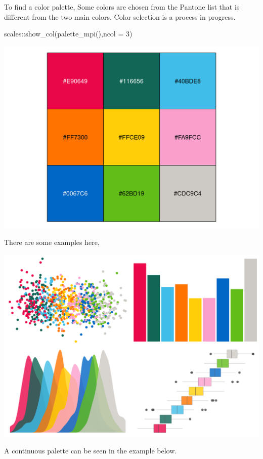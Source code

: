 \documentclass[
]{book}
\newenvironment{Shaded}{\begin{snugshade}}{\end{snugshade}}
\newcommand{\AttributeTok}[1]{\textcolor[rgb]{0.77,0.63,0.00}{#1}}
\newcommand{\DecValTok}[1]{\textcolor[rgb]{0.00,0.00,0.81}{#1}}
\newcommand{\FunctionTok}[1]{\textcolor[rgb]{0.00,0.00,0.00}{#1}}
\newcommand{\NormalTok}[1]{#1}
\newcommand{\SpecialCharTok}[1]{\textcolor[rgb]{0.00,0.00,0.00}{#1}}
\begin{document}
To find a color palette, Some colors are chosen from the Pantone list that is different from the two main colors. Color selection is a process in progress.

\begin{Shaded}
\begin{Highlighting}[]
\NormalTok{scales}\SpecialCharTok{::}\FunctionTok{show\_col}\NormalTok{(}\FunctionTok{palette\_mpi}\NormalTok{(),}\AttributeTok{ncol =} \DecValTok{3}\NormalTok{)}
\end{Highlighting}
\end{Shaded}

\begin{center}\includegraphics[width=0.5\linewidth]{figures/mpithemes_palette-1} \end{center}

There are some examples here,

\begin{center}\includegraphics[width=1\linewidth]{figures/mpithemes_colors-1} \end{center}

A continuous palette can be seen in the example below.
\end{document}
